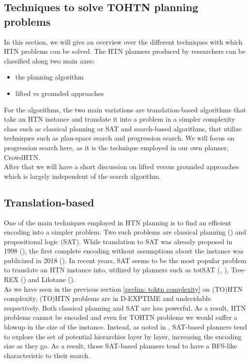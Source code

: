 \subsection{Techniques to solve TOHTN planning problems}
\label{prelim: techniques}
In this section, we will give an overview over the different techniques with which HTN problems can be solved. The HTN planners produced by researchers can be classified along two main axes:
\begin{itemize}
	\item the planning algorithm
	\item lifted vs grounded approaches
\end{itemize}
For the algorithms, the two main variations are translation-based algorithms that take an HTN instance and translate it into a problem in a simpler complexity class such as classical planning or SAT and search-based algorithms, that utilize techniques such as plan-space search and progression search. We will focus on progression search here, as it is the technique employed in our own planner, CrowdHTN. \\
After that we will have a short discussion on lifted versus grounded approaches which is largely independent of the search algorithm.
\begin{comment}
- multiple ways to solve HTN instances
- planners can be classified on two axis: the algorithm and lifted vs grounded
- in practise, most algorithms are based on translation to SAT or on search algorithms
- we will focus on search-based as we will see in later section \ref{prelim: crowdhtn} that this is what our own planner utilizes
\end{comment}

\subsection{Translation-based}
\label{prelim: translation based planners}
One of the main techniques employed in HTN planning is to find an efficient encoding into a simpler problem. Two such problems are classical planning (\cite{alford2016bound}) and propositional logic (SAT). While translation to SAT was already proposed in 1998 (\cite{mali1998encoding}), the first complete encoding without assumptions about the instance was publicized in 2018 (\cite{behnke2018totsat}). In recent years, SAT seems to be the most popular problem to translate an HTN instance into, utilized by planners such as totSAT (\cite{behnke2018totsat}, \cite{behnke2018tracking}), Tree-REX (\cite{schreiber2019tree}) and Lilotane (\cite{schreiber2021lilotane}). \\
As we have seen in the previous section \ref{prelim: tohtn complexity} on (TO)HTN complexity, (TO)HTN problems are in D-EXPTIME and undecidable respectively. Both classical planning and SAT are less powerful. As a result, HTN problems cannot be encoded and even for TOHTN problems we would suffer a blowup in the size of the instance. Instead, as noted in \cite{schreiber2019tree}, SAT-based planners tend to explore the set of potential hierarchies layer by layer, increasing the encoding size as they go. As a result, those SAT-based planners tend to have a BFS-like characteristic to their search.

